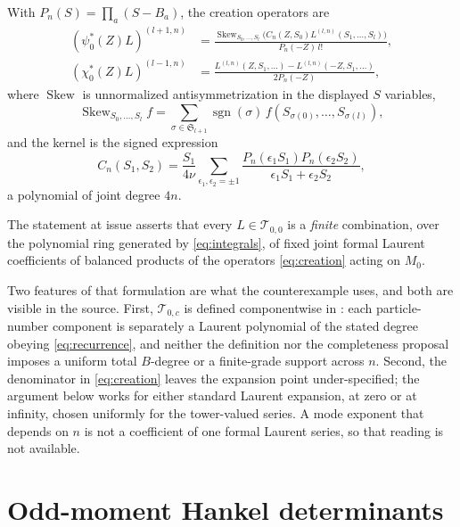 \documentclass[11pt,reqno]{amsart}
\theoremstyle{plain}
\theoremstyle{definition}
\theoremstyle{remark}
\numberwithin{equation}{section}
\begin{document}
With $P_n(S)=\prod_a(S-B_a)$, the creation operators are
\begin{equation}
  \label{eq:creation}
  \begin{aligned}
    (\psi_0^*(Z)L)^{(l+1,n)}
    &=\frac{\operatorname{Skew}_{S_0,\dots,S_l}
        \bigl(C_n(Z,S_0)L^{(l,n)}(S_1,\dots,S_l)\bigr)}{P_n(-Z)\,l!},\\
    (\chi_0^*(Z)L)^{(l-1,n)}
    &=\frac{L^{(l,n)}(Z,S_1,\dots)-L^{(l,n)}(-Z,S_1,\dots)}{2P_n(-Z)},
  \end{aligned}
\end{equation}
where $\operatorname{Skew}$ is unnormalized antisymmetrization in the
displayed $S$ variables,
\begin{equation*}
  \operatorname{Skew}_{S_0,\dots,S_l}f
  =\sum_{\sigma\in\mathfrak S_{l+1}}\operatorname{sgn}(\sigma)\,
    f(S_{\sigma(0)},\dots,S_{\sigma(l)}),
\end{equation*}
and the kernel is the signed expression
\begin{equation}
  \label{eq:kernel}
  C_n(S_1,S_2)=\frac{S_1}{4\nu}
    \sum_{\epsilon_1,\epsilon_2=\pm1}
    \frac{P_n(\epsilon_1S_1)P_n(\epsilon_2S_2)}
         {\epsilon_1S_1+\epsilon_2S_2},
\end{equation}
a polynomial of joint degree $4n$.

The statement at issue asserts that every $L\in\mathcal T_{0,0}$ is a
\emph{finite} combination, over the polynomial ring generated by
\eqref{eq:integrals}, of fixed joint formal Laurent coefficients of
balanced products of the operators \eqref{eq:creation} acting on $M_0$.

Two features of that formulation are what the counterexample uses, and
both are visible in the source. First, $\mathcal T_{0,c}$ is defined
componentwise in \cite{Jimbo_2011fs}: each particle-number
component is separately a Laurent polynomial of the stated degree obeying
\eqref{eq:recurrence}, and neither the definition nor the completeness
proposal imposes a uniform total $B$-degree or a finite-grade support across
$n$. Second, the denominator in \eqref{eq:creation} leaves the expansion
point under-specified; the argument below works for either standard Laurent
expansion, at zero or at infinity, chosen uniformly for the tower-valued
series. A mode exponent that depends on $n$ is not a coefficient of one
formal Laurent series, so that reading is not available.

\section{Odd-moment Hankel determinants}
\label{sec:hankel}
\end{document}
